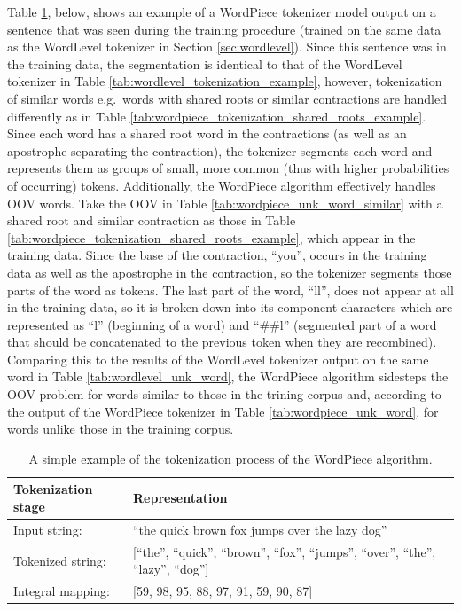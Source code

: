 \documentclass[12pt]{article}
\begin{document}
Table \ref{tab:wordpiece_tokenization_example}, below, shows an example of a WordPiece tokenizer model output on a sentence that was seen during the
training procedure (trained on the same data as the WordLevel tokenizer in Section \ref{sec:wordlevel}). Since this sentence was in the training data,
the segmentation is identical to that of the WordLevel tokenizer in Table \ref{tab:wordlevel_tokenization_example}, however, tokenization of similar
words e.g.~words with shared roots or similar contractions are handled differently as in Table \ref{tab:wordpiece_tokenization_shared_roots_example}.
Since each word has a shared root word in the contractions (as well as an apostrophe separating the contraction), the tokenizer segments each word and
represents them as groups of small, more common (thus with higher probabilities of occurring) tokens. Additionally, the WordPiece algorithm
effectively handles OOV words. Take the OOV in Table \ref{tab:wordpiece_unk_word_similar} with a shared root and similar contraction as those in Table
\ref{tab:wordpiece_tokenization_shared_roots_example}, which appear in the training data. Since the base of the contraction, ``you'', occurs in the
training data as well as the apostrophe in the contraction, so the tokenizer segments those parts of the word as tokens. The last part of the word,
``ll'', does not appear at all in the training data, so it is broken down into its component characters which are represented as ``l'' (beginning of
a word) and ``\#\#l'' (segmented part of a word that should be concatenated to the previous token when they are recombined). Comparing this to the
results of the WordLevel tokenizer output on the same word in Table \ref{tab:wordlevel_unk_word}, the WordPiece algorithm sidesteps the OOV problem
for words similar to those in the trining corpus and, according to the output of the WordPiece tokenizer in Table \ref{tab:wordpiece_unk_word}, for
words unlike those in the training corpus.

\begin{table}[!t]
    \centering
    \begin{tabular}{l l}
        \toprule
        Tokenization stage & Representation                                                                            \\
        \midrule
        Input string:      & ``the quick brown fox jumps over the lazy dog''                                           \\
        Tokenized string:  & [``the'', ``quick'', ``brown'', ``fox'', ``jumps'', ``over'', ``the'', ``lazy'', ``dog''] \\
        Integral mapping:  & [59, 98, 95, 88, 97, 91, 59, 90, 87]                                                      \\
        \bottomrule
    \end{tabular}
    \caption{A simple example of the tokenization process of the WordPiece algorithm.}
    \label{tab:wordpiece_tokenization_example}
\end{table}
\end{document}
